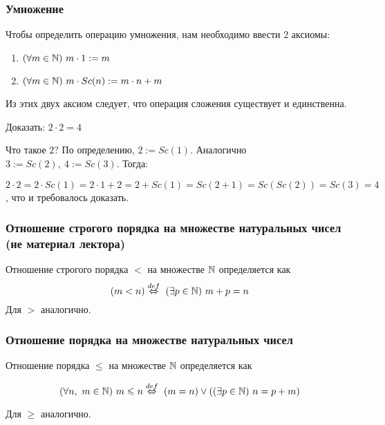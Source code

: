 \subsubsection*{Умножение}

Чтобы определить операцию умножения, нам необходимо
ввести 2 аксиомы:
\begin{enumerate}
    \item $(\forall m \in \mathbb{N})\ m \cdot 1 := m$
    \item $(\forall m \in \mathbb{N})\ m \cdot Sc(n) := m \cdot n + m$
\end{enumerate}

Из этих двух аксиом следует, что операция сложения существует и единственна.

\begin{example}
    Доказать: $2 \cdot 2 = 4$
    
    Что такое $2$? По определению, $2 := Sc(1)$.
    Аналогично $3 := Sc(2),\ 4 := Sc(3)$. Тогда:
    
    $2 \cdot 2 = 2 \cdot Sc(1) = 2 \cdot 1 + 2 = 2 + Sc(1)
    = Sc(2 + 1) = Sc(Sc(2)) = Sc(3) = 4$, что и требовалось доказать.
\end{example}

\subsubsection*{Отношение строгого порядка на множестве
натуральных чисел (не материал лектора)}

\begin{definition}
    Отношение строгого порядка $<$ на множестве $\mathbb{N}$ определяется как
    \[
        (m < n) \overset{def}{\Leftrightarrow}\ (\exists p \in \mathbb{N})\ m + p = n
    \]
    Для $>$ аналогично.
\end{definition}

\subsubsection*{Отношение порядка на множестве натуральных чисел}

\begin{definition}
	Отношение порядка $\le$ на множестве $\mathbb{N}$ определяется как

	\[
        (\forall n,\ m \in \N)\ m \le n \overset{def}{\lra}\ 
        (m = n) \vee ((\exists p \in \N)\ n = p + m)
    \]

	Для $\ge$ аналогично.
\end{definition}

